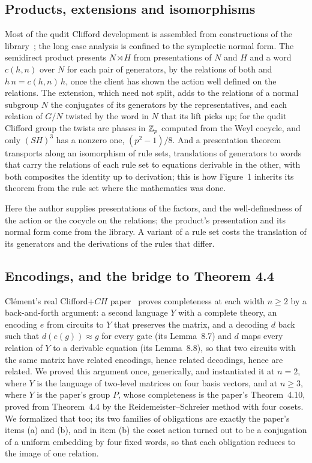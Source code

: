 \subsection{Products, extensions and isomorphisms}\label{sec:products}

Most of the qudit Clifford development is assembled from constructions
of the library~\cite{anonymous2027popl}; the long case analysis is
confined to the symplectic normal form. The semidirect product
presents $N\rtimes H$ from presentations of $N$ and $H$ and a word
$c(h,n)$ over $N$ for each pair of generators, by the relations of
both and $h\,n = c(h,n)\,h$, once the client has shown the action well
defined on the relations. The extension, which need not split, adds to
the relations of a normal subgroup $N$ the conjugates of its
generators by the representatives, and each relation of $G/N$ twisted
by the word in $N$ that its lift picks up; for the qudit Clifford group
the twists are phases in $\mathbb{Z}_p$ computed from the Weyl cocycle, and
only $(SH)^3$ has a nonzero one, $(p^2-1)/8$. And a presentation
theorem transports along an isomorphism of rule sets, translations of
generators to words that carry the relations of each rule set to
equations derivable in the other, with both composites the identity up
to derivation; this is how Figure~1 inherits its theorem from the rule
set where the mathematics was done.

Here the author supplies presentations of the factors, and the
well-definedness of the action or the cocycle on the relations; the
product's presentation and its normal form come from the library. A
variant of a rule set costs the translation of its generators and the
derivations of the rules that differ.

\subsection{Encodings, and the bridge to Theorem 4.4}\label{sec:encoding}

Cl\'ement's real Clifford+$CH$ paper~\cite{clement2026realcliffordch}
proves completeness at each width $n\ge2$ by a back-and-forth argument:
a second language $Y$ with a complete theory, an encoding $e$ from
circuits to $Y$ that preserves the matrix, and a decoding $d$ back
such that $d(e(g)) \approx g$ for every gate (its Lemma~8.7) and $d$
maps every relation of $Y$ to a derivable equation (its Lemma~8.8), so
that two circuits with the same matrix have related encodings, hence
related decodings, hence are related. We proved this argument once,
generically, and instantiated it at $n=2$, where $Y$ is the language
of two-level matrices on four basis vectors, and at $n\ge3$, where $Y$
is the paper's group $P$, whose completeness is the paper's
Theorem~4.10, proved from Theorem~4.4 by the Reidemeister--Schreier
method with four cosets. We formalized that too; its two families of
obligations are exactly the paper's items (a) and (b), and in item (b)
the coset action turned out to be a conjugation of a uniform embedding
by four fixed words, so that each obligation reduces to the image of
one relation.

